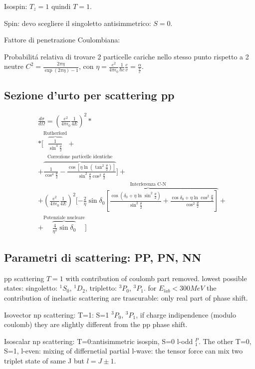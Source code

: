 \documentclass[main.tex]{subfiles}
\begin{document}
Isospin: $T_z=1$ quindi $T=1$.

Spin: devo scegliere il singoletto antisimmetrico: $S=0$.

Fattore di penetrazione Coulombiana:

Probabilit\'a relativa di trovare 2 particelle cariche nello stesso punto rispetto a 2 neutre $C^2=\frac{2\pi\eta}{\exp{(2\pi\eta)}-1}$, con $\eta=\frac{e^2}{4\pi\epsilon_0}\frac{1}{\hbar c}\frac{c}{v}=\frac{\alpha}{\frac{v}{c}}$.

\subsection{Sezione d'urto per scattering pp}
\begin{align*}
&\frac{d\sigma}{d\Omega}=(\frac{e^2}{4\pi\epsilon_0}\frac{1}{4E})^2*\\
&*[\overbrace{\frac{1}{\sin^4{\frac{\theta}{2}}}}^{\text{Rutherford}}+\\
&+\overbrace{\frac{1}{\cos^4{\frac{\theta}{2}}}-\frac{\cos{[\eta\ln{(\tan^2{\frac{\theta}{2}})}]}}{\sin^2{\frac{\theta}{2}}\cos^2{\frac{\theta}{2}}}}^{\text{Correzione particelle identiche}}]+\\
&+(\frac{e^2}{4\pi\epsilon_0}\frac{1}{4E})^2[\overbrace{-\frac{2}{\eta}\sin{\delta_0}[\frac{\cos{(\delta_0+\eta\ln{\sin^2{\frac{\theta}{2}}})}}{\sin^2{\frac{\theta}{2}}}+\frac{\cos{\delta_0+\eta\ln{\cos^2{\frac{\theta}{2}}}}}{\cos^2{\frac{\theta}{2}}}]}^{\text{Interferenza C-N}}+\\
&+\overbrace{\frac{4}{\eta^2}\sin{\delta_0}}^{\text{Potenziale nucleare}}]
\end{align*}


\subsection{Parametri di scattering: PP, PN, NN}

pp scattering $T=1$ with contribution of coulomb part removed. lowest possible states: singoletto: $^1S_0$, $^1D_2$, tripletto: $^3P_0$, $^3P_1$. for $E_{lab}<300 MeV$ the contribution of inelastic scattering are trascurable: only real part of phase shift.


Isovector np scattering: T=1: S=1 $^3P_0$, $^3P_1$, if charge indipendence (modulo coulomb) they are slightly different from the pp phase shift.

Isoscalar np scattering: T=0:antisimmetric isospin, S=0 l-odd $^P_1$. The other T=0, S=1, l-even: mixing of differnetial partial l-wave: the tensor force can mix two triplet state of same J but $l=J\pm1$.
\end{document}
